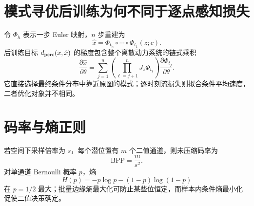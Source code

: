 \documentclass[11pt]{article}
\numberwithin{equation}{section}
\newcommand{\1}{\mathbf{1}}
\begin{document}
\section{模式寻优后训练为何不同于逐点感知损失}
令 $\Phi_h$ 表示一步 Euler 映射，$n$ 步重建为
\begin{equation}
  \hat x=\Phi_{t_n}\circ\cdots\circ\Phi_{t_1}(z;c).
\end{equation}
后训练目标 $d_{\rm perc}(x,\hat x)$ 的梯度包含整个离散动力系统的链式乘积
\begin{equation}
  \frac{\partial\hat x}{\partial\theta}
  =\sum_{j=1}^n
  \left(\prod_{\ell=j+1}^{n}J_z\Phi_{t_\ell}\right)
  \frac{\partial\Phi_{t_j}}{\partial\theta}.
\end{equation}
它直接选择最终条件分布中靠近原图的模式；逐时刻流损失则拟合条件平均速度，二者优化对象并不相同。

\section{码率与熵正则}
若空间下采样倍率为 $s$，每个潜位置有 $m$ 个二值通道，则未压缩码率为
\begin{equation}
  \mathrm{BPP}=\frac{m}{s^2}.
\end{equation}
对单通道 Bernoulli 概率 $p$，熵
\begin{equation}
  H(p)=-p\log p-(1-p)\log(1-p)
\end{equation}
在 $p=1/2$ 最大；批量边缘熵最大化可防止某些位恒定，而样本内条件熵最小化促使二值决策确定。
\end{document}
